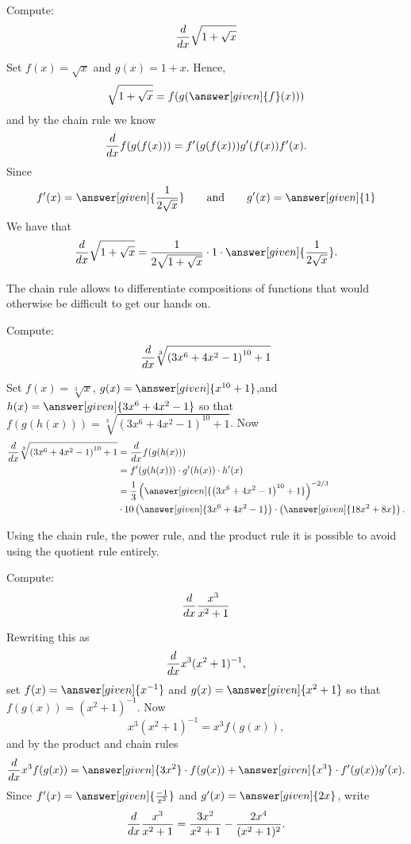 \documentclass{ximera}
\begin{document}
\begin{example}
Compute:
\[
\frac{d}{\mathop{}\!d x} \sqrt{1+\sqrt{x}}
\]

\begin{explanation}
Set 
$f(x)=\sqrt{x}$ and $g(x)=1+x$. Hence,
\[
\sqrt{1+\sqrt{x}}=f(g(\answer[given]{f}(x)))
\]
and by the chain rule we know
\[
\frac{d}{\mathop{}\!d x} f(g(f(x))) = f'(g(f(x)))g'(f(x))f'(x).
\]
Since 
\[
f'(x) = \answer[given]{\frac{1}{2\sqrt{x}}} \qquad\text{and}\qquad g'(x) = \answer[given]{1}
\]
We have that
\[
\ddx \sqrt{1+\sqrt{x}} = \frac{1}{2\sqrt{1+\sqrt{x}}}\cdot 1\cdot  \answer[given]{\frac{1}{2\sqrt{x}}}.
\]
\end{explanation}
\end{example}

The chain rule allows to differentiate compositions of functions that
would otherwise be difficult to get our hands on.

\begin{example}
Compute:
\[
\frac{d}{\mathop{}\!d x} \sqrt[3]{\left(3x^6+4x^2-1\right)^{10} + 1 }
\]

\begin{explanation}
Set $f(x) = \sqrt[3]{x}$, $g(x) = \answer[given]{x^{10}+1}$,and $h(x) = \answer[given]{3x^6+4x^2-1}$
so that $f(g(h(x))) = \sqrt[3]{\left(3x^6+4x^2-1\right)^{10} + 1 }$. Now
\begin{align*}
  \ddx \sqrt[3]{\left(3x^6+4x^2-1\right)^{10} + 1 } &= \ddx f(g(h(x)))\\
  &= f'(g(h(x))) \cdot g'(h(x)) \cdot h'(x)\\
  &= \frac{1}{3}\left(\answer[given]{\left(3x^6+4x^2-1\right)^{10} + 1}\right)^{-2/3} \\ & \cdot 10 \left(\answer[given]{3x^6+4x^2-1}\right) \cdot \left(\answer[given]{18x^2+8x}\right).
\end{align*}
\end{explanation}
\end{example}




Using the chain rule, the power rule, and the product rule it is
possible to avoid using the quotient rule entirely.

\begin{example}
Compute:
\[
\frac{d}{\mathop{}\!d x} \frac{x^3}{x^2+1} 
\] 

\begin{explanation}
Rewriting this as 
\[
\frac{d}{\mathop{}\!d x} x^3(x^2+1)^{-1}, 
\]
set $f(x) = \answer[given]{x^{-1}}$ and $g(x) = \answer[given]{x^2+1}$ so that $f(g(x)) = (x^2 + 1)^{-1}$. Now
\[
x^3(x^2+1)^{-1} = x^3 f(g(x)),
\]
and by the product and chain rules
\[
\ddx x^3 f(g(x)) = \answer[given]{3x^2} \cdot f(g(x))+ \answer[given]{x^3} \cdot f'(g(x))g'(x).
\]
Since $f'(x) = \answer[given]{\frac{-1}{x^2}}$ and $g'(x) = \answer[given]{2x}$, write
\[
\frac{d}{\mathop{}\!d x} \frac{x^3}{x^2+1} = \frac{3x^2}{x^2+1}-\frac{2x^4}{(x^2+1)^2}.
\]
\end{explanation}
\end{example}
\end{document}
